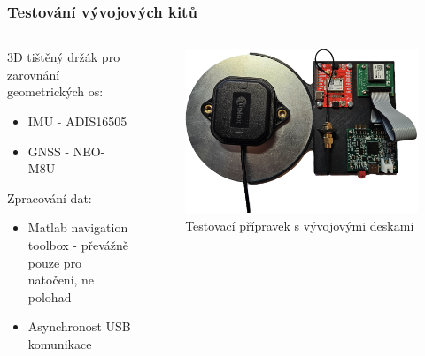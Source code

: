 \documentclass[%
  12pt,       				%
	t,                  %
	aspectratio=1610,   %
	unicode,						%
]{beamer}				    	%
\begin{document}
\begin{frame} 
	\frametitle{Testování vývojových kitů}
	
	\begin{columns}[T] 								%
		\begin{column}{0.3\textwidth}		%
			3D tištěný držák pro zarovnání geometrických os:
			\begin{itemize}
				\item IMU - ADIS16505
				\item GNSS - NEO-M8U
			\end{itemize}
			\vspace{0.5cm}
			Zpracování dat:
			\begin{itemize}
				\item Matlab navigation toolbox - převážně pouze pro natočení, ne polohad
				\item Asynchronost USB komunikace
			\end{itemize}
		\end{column}
		\begin{column}{0.7\textwidth}		%
			\begin{figure}%
				\centering
				\includegraphics[width=0.9\columnwidth]{obrazky/devBoards}
				\caption{Testovací přípravek s vývojovými deskami}%
			\end{figure}
		\end{column}
	\end{columns}						
			

	
\end{frame} 
\end{document}
